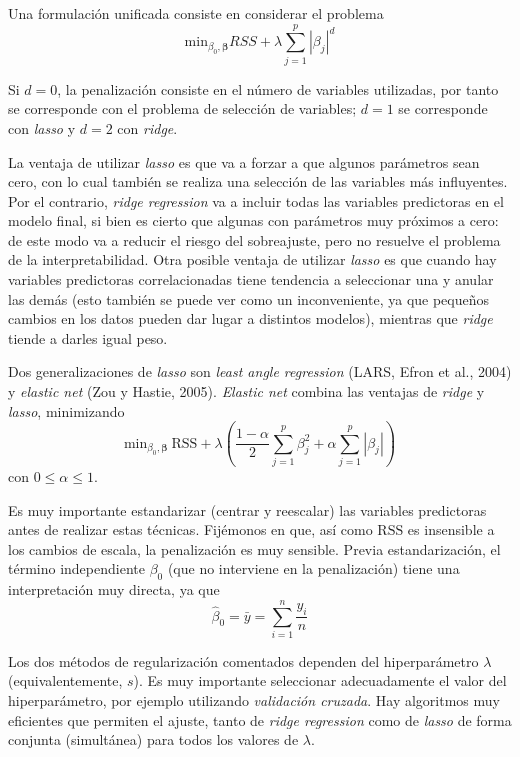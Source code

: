 \documentclass[
]{book}
\theoremstyle{break}
\theoremstyle{definition}
\theoremstyle{definition}
\theoremstyle{definition}
\theoremstyle{remark}
\begin{document}
Una formulación unificada consiste en considerar el problema
\[\mbox{min}_{\beta_0, \boldsymbol{\beta}} RSS + \lambda\sum_{j=1}^{p}|\beta_{j}|^d\]

Si \(d=0\), la penalización consiste en el número de variables utilizadas, por tanto se corresponde con el problema de selección de variables; \(d=1\) se corresponde con \emph{lasso} y \(d=2\) con \emph{ridge}.

La ventaja de utilizar \emph{lasso} es que va a forzar a que algunos parámetros sean cero, con lo cual también se realiza una selección de las variables más influyentes.
Por el contrario, \emph{ridge regression} va a incluir todas las variables predictoras en el modelo final, si bien es cierto que algunas con parámetros muy próximos a cero: de este modo va a reducir el riesgo del sobreajuste, pero no resuelve el problema de la interpretabilidad.
Otra posible ventaja de utilizar \emph{lasso} es que cuando hay variables predictoras correlacionadas tiene tendencia a seleccionar una y anular las demás (esto también se puede ver como un inconveniente, ya que pequeños cambios en los datos pueden dar lugar a distintos modelos), mientras que \emph{ridge} tiende a darles igual peso.

Dos generalizaciones de \emph{lasso} son \emph{least angle regression} (LARS, Efron et al., 2004) y \emph{elastic net} (Zou y Hastie, 2005).
\emph{Elastic net} combina las ventajas de \emph{ridge} y \emph{lasso}, minimizando
\[\mbox{min}_{\beta_0, \boldsymbol{\beta}} \ \mbox{RSS} + \lambda \left( \frac{1 - \alpha}{2}\sum_{j=1}^{p}\beta_{j}^{2} + \alpha \sum_{j=1}^{p}|\beta_{j}| \right)\]
con \(0 \leq \alpha \leq 1\).

Es muy importante estandarizar (centrar y reescalar) las variables predictoras antes de realizar estas técnicas.
Fijémonos en que, así como \(\mbox{RSS}\) es insensible a los cambios de escala, la penalización es muy sensible.
Previa estandarización, el término independiente \(\beta_0\) (que no interviene en la penalización) tiene una interpretación muy directa, ya que
\[\widehat \beta_0 = \bar y =\sum_{i=1}^n \frac{y_i}{n}\]

Los dos métodos de regularización comentados dependen del hiperparámetro \(\lambda\) (equivalentemente, \(s\)).
Es muy importante seleccionar adecuadamente el valor del hiperparámetro, por ejemplo utilizando \emph{validación cruzada}.
Hay algoritmos muy eficientes que permiten el ajuste, tanto de \emph{ridge regression} como de \emph{lasso} de forma conjunta (simultánea) para todos los valores de \(\lambda\).
\end{document}

